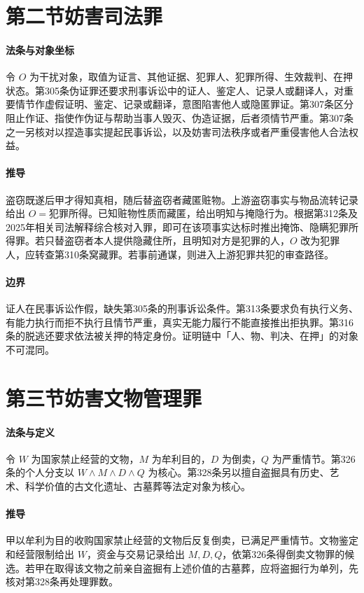 \section{第二节\quad 妨害司法罪}

\paragraph{法条与对象坐标}
令 \(O\) 为干扰对象，取值为证言、其他证据、犯罪人、犯罪所得、生效裁判、在押状态。第305条伪证罪还要求刑事诉讼中的证人、鉴定人、记录人或翻译人，对重要情节作虚假证明、鉴定、记录或翻译，意图陷害他人或隐匿罪证。第307条区分阻止作证、指使作伪证与帮助当事人毁灭、伪造证据，后者须情节严重。第307条之一另核对以捏造事实提起民事诉讼，以及妨害司法秩序或者严重侵害他人合法权益。

\paragraph{推导}
盗窃既遂后甲才得知真相，随后替盗窃者藏匿赃物。上游盗窃事实与物品流转记录给出 \(O=\text{犯罪所得}\)。已知赃物性质而藏匿，给出明知与掩隐行为。根据第312条及2025年相关司法解释综合核对入罪，即可在该项事实达标时推出掩饰、隐瞒犯罪所得罪。若只替盗窃者本人提供隐藏住所，且明知对方是犯罪的人，\(O\) 改为犯罪人，应转查第310条窝藏罪。若事前通谋，则进入上游犯罪共犯的审查路径。

\paragraph{边界}
证人在民事诉讼作假，缺失第305条的刑事诉讼条件。第313条要求负有执行义务、有能力执行而拒不执行且情节严重，真实无能力履行不能直接推出拒执罪。第316条的脱逃还要求依法被关押的特定身份。证明链中「人、物、判决、在押」的对象不可混同。

\section{第三节\quad 妨害文物管理罪}

\paragraph{法条与定义}
令 \(W\) 为国家禁止经营的文物，\(M\) 为牟利目的，\(D\) 为倒卖，\(Q\) 为严重情节。第326条的个人分支以 \(W\land M\land D\land Q\) 为核心。第328条另以擅自盗掘具有历史、艺术、科学价值的古文化遗址、古墓葬等法定对象为核心。

\paragraph{推导}
甲以牟利为目的收购国家禁止经营的文物后反复倒卖，已满足严重情节。文物鉴定和经营限制给出 \(W\)，资金与交易记录给出 \(M,D,Q\)，依第326条得倒卖文物罪的候选。若甲在取得该文物之前亲自盗掘有上述价值的古墓葬，应将盗掘行为单列，先核对第328条再处理罪数。

